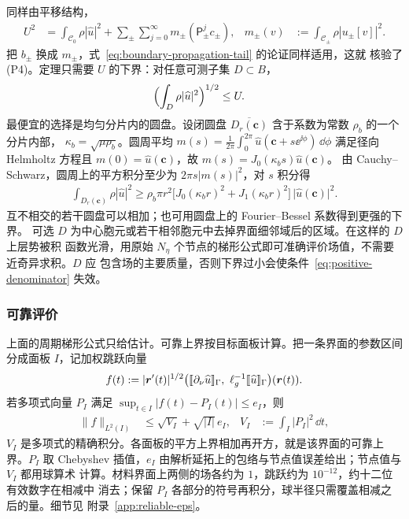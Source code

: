 同样由平移结构，
\begin{align}
  U^2&=\int_{\mathcal C_0}\rho|\widehat u|^2
    +\sum_{\pm}\sum_{j=0}^{\infty}m_\pm(\mathsf P_\pm^jc_\pm),
  &m_\pm(v)&:=\int_{\mathcal C_\pm}\rho|u_\pm[v]|^2.
  \label{eq:mass-propagation-sum}
\end{align}
把 $b_\pm$ 换成 $m_\pm$，式~\eqref{eq:boundary-propagation-tail} 的论证同样适用，这就
核验了 (P4)。定理只需要 $U$ 的下界：对任意可测子集 $D\subset B$，
\begin{align}
  \Bigl(\int_D\rho|\widehat u|^2\Bigr)^{1/2}&\leq U.
  \label{eq:mass-lower-bound}
\end{align}
最便宜的选择是均匀分片内的圆盘。设闭圆盘
$\overline{D_r(\mathbf c)}$ 含于系数为常数 $\rho_b$ 的一个分片内部，
$\kappa_b=\sqrt{\mu\rho_b}$。圆周平均 $m(s)=\frac1{2\pi}\int_0^{2\pi}\widehat u(\mathbf c+s\ee^{\ii\phi})\,\dd\phi$
满足径向 Helmholtz 方程且 $m(0)=\widehat u(\mathbf c)$，故 $m(s)=J_0(\kappa_bs)\widehat u(\mathbf c)$。
由 Cauchy--Schwarz，圆周上的平方积分至少为 $2\pi s\lvert m(s)\rvert^2$，对 $s$ 积分得
\begin{align}
  \int_{D_r(\mathbf c)}\rho|\widehat u|^2
  \geq\rho_b\pi r^2\bigl[J_0(\kappa_br)^2+J_1(\kappa_br)^2\bigr]\,\lvert\widehat u(\mathbf c)\rvert^2 .
  \label{eq:disk-mass-lower-bound}
\end{align}
互不相交的若干圆盘可以相加；也可用圆盘上的 Fourier--Bessel 系数得到更强的下界。
可选 $D$ 为中心胞元或若干相邻胞元中去掉界面细邻域后的区域。在这样的 $D$ 上层势被积
函数光滑，用原始 $N_\eta$ 个节点的梯形公式即可准确评价场值，不需要近奇异求积。$D$ 应
包含场的主要质量，否则下界过小会使条件~\eqref{eq:positive-denominator} 失效。

\subsubsection{可靠评价}
\label{subsec:reliable-evaluation}

上面的周期梯形公式只给估计。可靠上界按目标面板计算。把一条界面的参数区间分成面板
$I$，记加权跳跃向量
\begin{align*}
  f(t):=|\boldsymbol r'(t)|^{1/2}\bigl(\jump{\partial_\nu\widehat u}_\Gamma,\ 
  \ell_g^{-1}\jump{\widehat u}_\Gamma\bigr)(\boldsymbol r(t)).
\end{align*}
若多项式向量 $P_I$ 满足 $\sup_{t\in I}|f(t)-P_I(t)|\leq e_I$，则
\begin{align}
  \lVert f\rVert_{L^2(I)}
  &\leq\sqrt{V_I}+\sqrt{|I|}\,e_I,
  &V_I&:=\int_I|P_I|^2\,\dd t,
  \label{eq:panel-defect-bound}
\end{align}
$V_I$ 是多项式的精确积分。各面板的平方上界相加再开方，就是该界面的可靠上界。$P_I$ 取
Chebyshev 插值，$e_I$ 由解析延拓上的包络与节点值误差给出；节点值与 $V_I$ 都用球算术
计算。材料界面上两侧的场各约为 $1$，跳跃约为 $10^{-12}$，约十二位有效数字在相减中
消去；保留 $P_I$ 各部分的符号再积分，球半径只需覆盖相减之后的量。细节见
附录~\ref{app:reliable-eps}。



